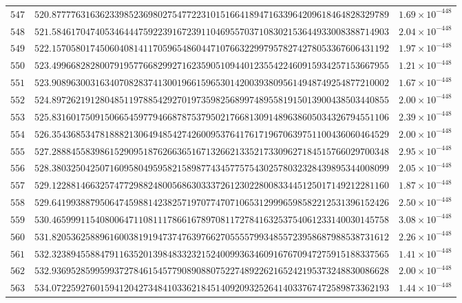 \documentclass[12pt,reqno]{amsart}
\theoremstyle{remark}
\begin{document}
\begin{longtable}{clc}
$547$ & $520.8777763163623398523698027547722310151664189471633964209618464828329789$ & $1.69\times 10^{-448}$ \\
$548$ & $521.5846170474053464447592239167239110469557037108302153644933008388714903$ & $2.04\times 10^{-448}$ \\
$549$ & $522.1570580174506040814117059654860447107663229979578274278053367606431192$ & $1.97\times 10^{-448}$ \\
$550$ & $523.4996682828007919577668299271623590510944012355422460915934257153667955$ & $1.21\times 10^{-448}$ \\
$551$ & $523.9089630031634070828374130019661596530142003938095614948749254877210002$ & $1.67\times 10^{-448}$ \\
$552$ & $524.8972621912804851197885429270197359825689974895581915013900438503440855$ & $2.00\times 10^{-448}$ \\
$553$ & $525.8316017509150665459779466878753795021766813091489638605034326794551106$ & $2.39\times 10^{-448}$ \\
$554$ & $526.3543685347818882130649485427426009537641761719670639751100436060464529$ & $2.00\times 10^{-448}$ \\
$555$ & $527.2888455839861529095187626636516713266213352173309627184515766029700348$ & $2.95\times 10^{-448}$ \\
$556$ & $528.3803250425071609580495958215898774345775754302578032328439895344008099$ & $2.05\times 10^{-448}$ \\
$557$ & $529.1228814663257477298824800568630333726123022800833445125017149212281160$ & $1.87\times 10^{-448}$ \\
$558$ & $529.6419938879506474598814238257197077470710653129996598582212531396152426$ & $2.50\times 10^{-448}$ \\
$559$ & $530.4659991154080064711081117866167897081172784163253754061233140030145758$ & $3.08\times 10^{-448}$ \\
$560$ & $531.8205362588961600381919473747639766270555579934855723958687988538731612$ & $2.26\times 10^{-448}$ \\
$561$ & $532.3238945588479116352013984833232152400993634609167670947275915188337565$ & $1.41\times 10^{-448}$ \\
$562$ & $532.9369528599599372784615457790890880752274892262165242195373248830086628$ & $2.00\times 10^{-448}$ \\
$563$ & $534.0722592760159412042734841033621845140920932526414033767472589873362193$ & $1.44\times 10^{-448}$ \\

\end{longtable}
\end{document}
